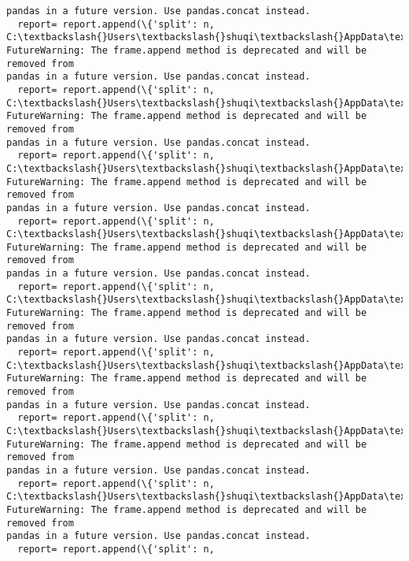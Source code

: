 \documentclass[11pt]{article}
\begin{document}
\begin{Verbatim}[commandchars=\\\{\}]
pandas in a future version. Use pandas.concat instead.
  report= report.append(\{'split': n,
C:\textbackslash{}Users\textbackslash{}shuqi\textbackslash{}AppData\textbackslash{}Local\textbackslash{}Temp\textbackslash{}ipykernel\_10424\textbackslash{}2982521988.py:19:
FutureWarning: The frame.append method is deprecated and will be removed from
pandas in a future version. Use pandas.concat instead.
  report= report.append(\{'split': n,
C:\textbackslash{}Users\textbackslash{}shuqi\textbackslash{}AppData\textbackslash{}Local\textbackslash{}Temp\textbackslash{}ipykernel\_10424\textbackslash{}2982521988.py:19:
FutureWarning: The frame.append method is deprecated and will be removed from
pandas in a future version. Use pandas.concat instead.
  report= report.append(\{'split': n,
C:\textbackslash{}Users\textbackslash{}shuqi\textbackslash{}AppData\textbackslash{}Local\textbackslash{}Temp\textbackslash{}ipykernel\_10424\textbackslash{}2982521988.py:19:
FutureWarning: The frame.append method is deprecated and will be removed from
pandas in a future version. Use pandas.concat instead.
  report= report.append(\{'split': n,
C:\textbackslash{}Users\textbackslash{}shuqi\textbackslash{}AppData\textbackslash{}Local\textbackslash{}Temp\textbackslash{}ipykernel\_10424\textbackslash{}2982521988.py:19:
FutureWarning: The frame.append method is deprecated and will be removed from
pandas in a future version. Use pandas.concat instead.
  report= report.append(\{'split': n,
C:\textbackslash{}Users\textbackslash{}shuqi\textbackslash{}AppData\textbackslash{}Local\textbackslash{}Temp\textbackslash{}ipykernel\_10424\textbackslash{}2982521988.py:19:
FutureWarning: The frame.append method is deprecated and will be removed from
pandas in a future version. Use pandas.concat instead.
  report= report.append(\{'split': n,
C:\textbackslash{}Users\textbackslash{}shuqi\textbackslash{}AppData\textbackslash{}Local\textbackslash{}Temp\textbackslash{}ipykernel\_10424\textbackslash{}2982521988.py:19:
FutureWarning: The frame.append method is deprecated and will be removed from
pandas in a future version. Use pandas.concat instead.
  report= report.append(\{'split': n,
C:\textbackslash{}Users\textbackslash{}shuqi\textbackslash{}AppData\textbackslash{}Local\textbackslash{}Temp\textbackslash{}ipykernel\_10424\textbackslash{}2982521988.py:19:
FutureWarning: The frame.append method is deprecated and will be removed from
pandas in a future version. Use pandas.concat instead.
  report= report.append(\{'split': n,
C:\textbackslash{}Users\textbackslash{}shuqi\textbackslash{}AppData\textbackslash{}Local\textbackslash{}Temp\textbackslash{}ipykernel\_10424\textbackslash{}2982521988.py:19:
FutureWarning: The frame.append method is deprecated and will be removed from
pandas in a future version. Use pandas.concat instead.
  report= report.append(\{'split': n,
    \end{Verbatim}
\end{document}
